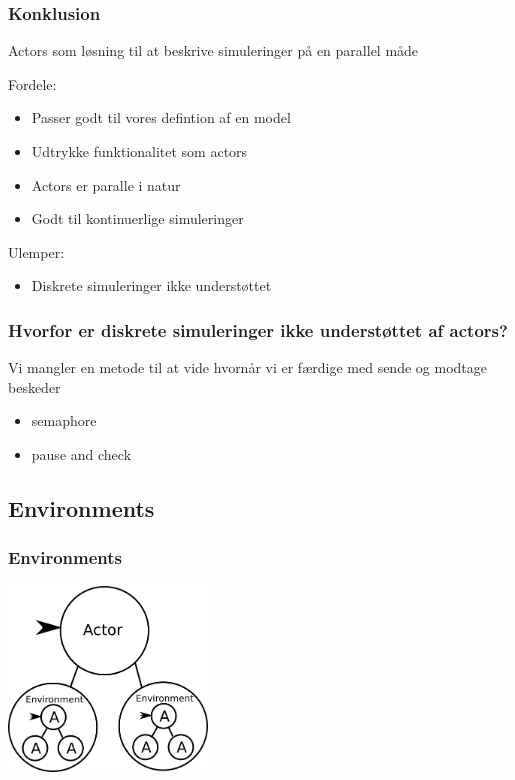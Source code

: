 \begin{frame}
	\frametitle{Konklusion}
	Actors som løsning til at beskrive simuleringer på en parallel måde
	
	
  Fordele:
    \begin{itemize}
      \item Passer godt til vores defintion af en model
      \item Udtrykke funktionalitet som actors
      \item Actors er paralle i natur
      \item Godt til kontinuerlige simuleringer
    \end{itemize}
  Ulemper:
    \begin{itemize}
      \item Diskrete simuleringer ikke understøttet
    \end{itemize}
\end{frame}

\begin{frame}
  \frametitle{Hvorfor er diskrete simuleringer ikke understøttet af actors?}
   Vi mangler en metode til at vide hvornår vi er færdige med sende og modtage beskeder
   
   \begin{itemize}
    \item semaphore
    \item pause and check
   \end{itemize}
\end{frame}

\subsection{Environments}
\begin{frame}
	\frametitle{Environments}
	\includegraphics[width=200px]{Images/environment.png}
\end{frame}
